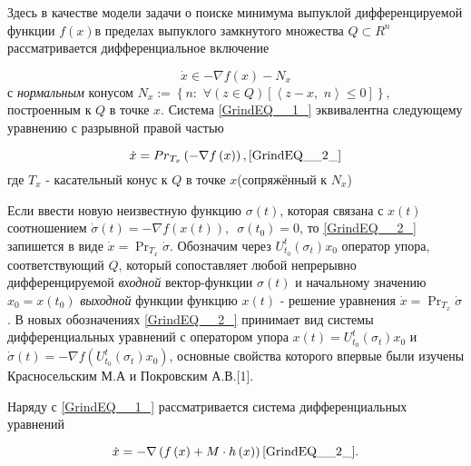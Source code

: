 \vzmscaption


Здесь в качестве модели задачи о поиске минимума выпуклой дифференцируемой функции $f\left(x\right)$в пределах выпуклого замкнутого множества $Q\subset R^{n} $рассматривается дифференциальное включение

\begin{equation} \label{GrindEQ__1_} \dot{x}\in -\nabla f\left(x\right)-N_{x}  \end{equation}
с \textit{нормальным} конусом $N_{x} :=\left\{n:\, \, \forall \left(z\in Q\right)\left[\left\langle z-x,\, \, n\right\rangle \le 0\right]\right\}$, построенным к $Q$ в точке $x$. Система \eqref{GrindEQ__1_}  эквивалентна следующему уравнению с разрывной правой частью

$$\dot{x}={Pr}_{T_{x} } \left(-\nabla f\left(x\right)\right),\eqref{GrindEQ__2_}$$                                            
где $T_{x} $ - касательный конус к $Q$ в точке $x$(сопряжённый к $N_{x} $)

Если ввести новую неизвестную функцию $\sigma (t)$, которая связана с $x(t)$ соотношением $\dot{\sigma }(t)=-\nabla f\left(x\left(t\right)\right),\, \, \, \sigma (t_{0} )=0$, то \eqref{GrindEQ__2_} запишется в виде $\dot{x}=\Pr _{T_{x} } \dot{\sigma }$. Обозначим через $U_{t_{0} }^{t} (\sigma _{t} )x_{0} $ оператор упора, соответствующий $Q$, который сопоставляет любой непрерывно дифференцируемой \textit{входной }вектор-функции $\sigma (t)$ и начальному значению $x_{0} =x(t_{0} )$\textit{ выходной} функции функцию $x(t)$ - решение уравнения $\dot{x}=\Pr _{T_{x} } \dot{\sigma }$. В новых обозначениях \eqref{GrindEQ__2_} принимает вид системы дифференциальных уравнений с оператором упора $x(t)=U_{t_{0} }^{t} (\sigma _{t} )x_{0} $ и $\dot{\sigma }(t)=-\nabla f\left(U_{t_{0} }^{t} (\sigma _{t} )x_{0} \right)$, основные свойства которого впервые были изучены Красносельским М.А и Покровским А.В.[1].

Наряду с \eqref{GrindEQ__1_} рассматривается система дифференциальных уравнений

$$\dot{x}=-\nabla \left(f\left(x\right)+M\cdot h\left(x\right)\right)\eqref{GrindEQ__2_}.$$                                     

